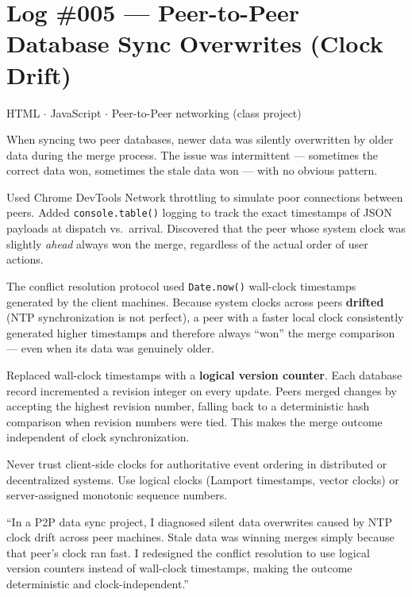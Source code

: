 \documentclass[11pt, letterpaper]{article}
\begin{document}
\section*{Log \#005 --- Peer-to-Peer Database Sync Overwrites (Clock Drift)}

\begin{tcolorbox}[colback=logbg, colframe=logborder, arc=3pt, boxrule=1pt]
\begin{description}[noitemsep, leftmargin=2cm, style=nextline]
  \item[\textbf{Stack}] HTML $\cdot$ JavaScript $\cdot$ Peer-to-Peer networking (class project)
  \item[\textbf{Symptom}] When syncing two peer databases, newer data was silently overwritten by older data during the merge process. The issue was intermittent --- sometimes the correct data won, sometimes the stale data won --- with no obvious pattern.
  \item[\textbf{Diagnosis}] Used Chrome DevTools Network throttling to simulate poor connections between peers. Added \texttt{console.table()} logging to track the exact timestamps of JSON payloads at dispatch vs.\ arrival. Discovered that the peer whose system clock was slightly \emph{ahead} always won the merge, regardless of the actual order of user actions.
  \item[\textbf{Root Cause}] The conflict resolution protocol used \texttt{Date.now()} wall-clock timestamps generated by the client machines. Because system clocks across peers \textbf{drifted} (NTP synchronization is not perfect), a peer with a faster local clock consistently generated higher timestamps and therefore always ``won'' the merge comparison --- even when its data was genuinely older.
  \item[\textbf{Fix}] Replaced wall-clock timestamps with a \textbf{logical version counter}. Each database record incremented a revision integer on every update. Peers merged changes by accepting the highest revision number, falling back to a deterministic hash comparison when revision numbers were tied. This makes the merge outcome independent of clock synchronization.
  \item[\textbf{Prevention}] Never trust client-side clocks for authoritative event ordering in distributed or decentralized systems. Use logical clocks (Lamport timestamps, vector clocks) or server-assigned monotonic sequence numbers.
  \item[\textbf{STAR summary}] ``In a P2P data sync project, I diagnosed silent data overwrites caused by NTP clock drift across peer machines. Stale data was winning merges simply because that peer's clock ran fast. I redesigned the conflict resolution to use logical version counters instead of wall-clock timestamps, making the outcome deterministic and clock-independent.''
\end{description}
\end{tcolorbox}
\end{document}
